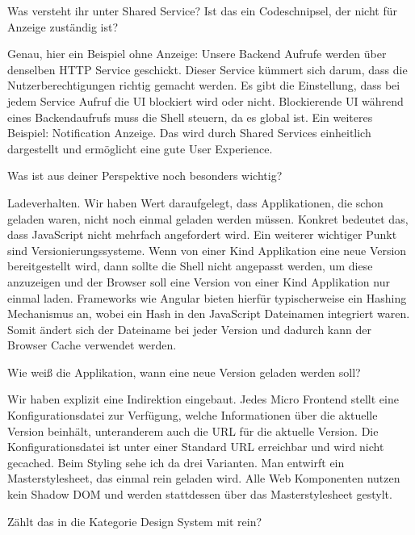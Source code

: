 \begin{description}
    \NicoVogel Was versteht ihr unter Shared Service? Ist das ein Codeschnipsel, der nicht für Anzeige zuständig ist?

    \BerndOlleck Genau, hier ein Beispiel ohne Anzeige: Unsere Backend Aufrufe werden über denselben HTTP Service geschickt. Dieser Service kümmert sich darum, dass die Nutzerberechtigungen richtig gemacht werden. Es gibt die Einstellung, dass bei jedem Service Aufruf die UI blockiert wird oder nicht. Blockierende UI während eines Backendaufrufs muss die Shell steuern, da es global ist. Ein weiteres Beispiel: Notification Anzeige. Das wird durch Shared Services einheitlich dargestellt und ermöglicht eine gute User Experience.

    \NicoVogel Was ist aus deiner Perspektive noch besonders wichtig?

    \BerndOlleck Ladeverhalten. Wir haben Wert daraufgelegt, dass Applikationen, die schon geladen waren, nicht noch einmal geladen werden müssen. Konkret bedeutet das, dass JavaScript nicht mehrfach angefordert wird. Ein weiterer wichtiger Punkt sind Versionierungssysteme. Wenn von einer Kind Applikation eine neue Version bereitgestellt wird, dann sollte die Shell nicht angepasst werden, um diese anzuzeigen und der Browser soll eine Version von einer Kind Applikation nur einmal laden. Frameworks wie Angular bieten hierfür typischerweise ein Hashing Mechanismus an, wobei ein Hash in den JavaScript Dateinamen integriert waren. Somit ändert sich der Dateiname bei jeder Version und dadurch kann der Browser Cache verwendet werden.

    \NicoVogel Wie weiß die Applikation, wann eine neue Version geladen werden soll?

    \BerndOlleck Wir haben explizit eine Indirektion eingebaut. Jedes Micro Frontend stellt eine Konfigurationsdatei zur Verfügung, welche Informationen über die aktuelle Version beinhält, unteranderem auch die URL für die aktuelle Version. Die Konfigurationsdatei ist unter einer Standard URL erreichbar und wird nicht gecached.
    Beim Styling sehe ich da drei Varianten. Man entwirft ein Masterstylesheet, das einmal rein geladen wird. Alle Web Komponenten nutzen kein Shadow DOM und werden stattdessen über das Masterstylesheet gestylt.

    \NicoVogel Zählt das in die Kategorie Design System mit rein?


\end{description}
